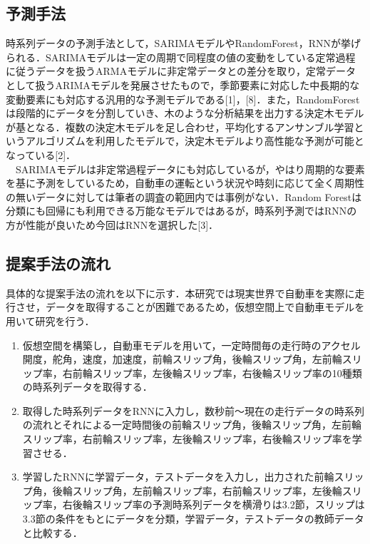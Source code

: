 \documentclass[twocolumn]{jsarticle}
\begin{document}
\subsection{予測手法}
時系列データの予測手法として，SARIMAモデルやRandomForest，RNNが挙げられる．SARIMAモデルは一定の周期で同程度の値の変動をしている定常過程に従うデータを扱うARMAモデルに非定常データとの差分を取り，定常データとして扱うARIMAモデルを発展させたもので，季節要素に対応した中長期的な変動要素にも対応する汎用的な予測モデルである[1]，[8]．また，RandomForestは段階的にデータを分割していき、木のような分析結果を出力する決定木モデルが基となる．複数の決定木モデルを足し合わせ，平均化するアンサンブル学習というアルゴリズムを利用したモデルで，決定木モデルより高性能な予測が可能となっている[2]．
\\　SARIMAモデルは非定常過程データにも対応しているが，やはり周期的な要素を基に予測をしているため，自動車の運転という状況や時刻に応じて全く周期性の無いデータに対しては筆者の調査の範囲内では事例がない．Random Forestは分類にも回帰にも利用できる万能なモデルではあるが，時系列予測ではRNNの方が性能が良いため今回はRNNを選択した[3]．
\subsection{提案手法の流れ}
具体的な提案手法の流れを以下に示す．本研究では現実世界で自動車を実際に走行させ，データを取得することが困難であるため，仮想空間上で自動車モデルを用いて研究を行う．

\begin{enumerate}
   \item 仮想空間を構築し，自動車モデルを用いて，一定時間毎の走行時のアクセル開度，舵角，速度，加速度，前輪スリップ角，後輪スリップ角，左前輪スリップ率，右前輪スリップ率，左後輪スリップ率，右後輪スリップ率の10種類の時系列データを取得する．
   \item 取得した時系列データをRNNに入力し，数秒前～現在の走行データの時系列の流れとそれによる一定時間後の前輪スリップ角，後輪スリップ角，左前輪スリップ率，右前輪スリップ率，左後輪スリップ率，右後輪スリップ率を学習させる．
   \item 学習したRNNに学習データ，テストデータを入力し，出力された前輪スリップ角，後輪スリップ角，左前輪スリップ率，右前輪スリップ率，左後輪スリップ率，右後輪スリップ率の予測時系列データを横滑りは3.2節，スリップは3.3節の条件をもとにデータを分類，学習データ，テストデータの教師データと比較する．
\end{enumerate}

\end{document}
